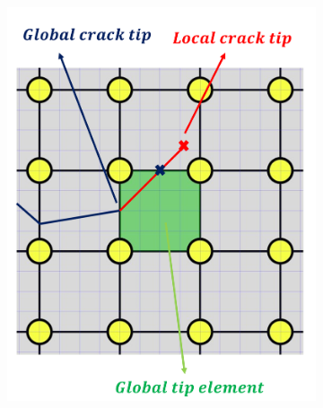 \begin{figure}
\centering
\begin{subfigure}{.331\textwidth}
  \centering
  \includegraphics[width=.99\linewidth]{img/Section2/schematic_1.png}
  \caption{}
  \label{fig:prop_1}
\end{subfigure}%
\begin{subfigure}{.33\textwidth}
  \centering

\end{subfigure}
\end{figure}
